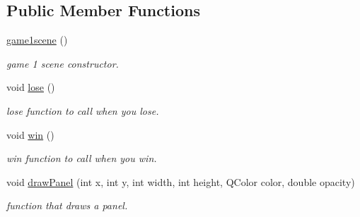 \subsection*{Public Member Functions}
\begin{DoxyCompactItemize}
\item 
\hyperlink{classgame1scene_ac540834f7d119c2c89a7e17306e2a1c0}{game1scene} ()
\begin{DoxyCompactList}\small\item\em game 1 scene constructor. \end{DoxyCompactList}\item 
void \hyperlink{classgame1scene_a7ea830c4a703722bc5450f29fbfddced}{lose} ()
\begin{DoxyCompactList}\small\item\em lose function to call when you lose. \end{DoxyCompactList}\item 
void \hyperlink{classgame1scene_a760917f4ad49e991bba784f16a468f98}{win} ()
\begin{DoxyCompactList}\small\item\em win function to call when you win. \end{DoxyCompactList}\item 
void \hyperlink{classgame1scene_a730f4e696efa1ea246678e9d2a59a217}{draw\+Panel} (int x, int y, int width, int height, Q\+Color color, double opacity)
\begin{DoxyCompactList}\small\item\em function that draws a panel. \end{DoxyCompactList}\end{DoxyCompactItemize}
